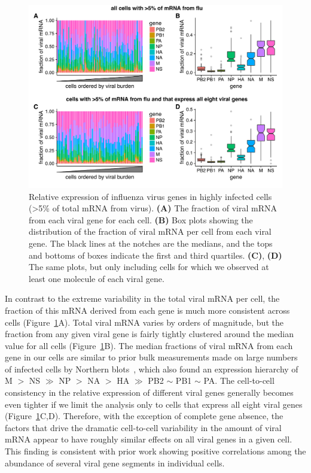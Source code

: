 \documentclass[9pt,lineno]{elife}
\begin{document}
\begin{figure}
\centerline{\includegraphics[width=0.9\linewidth]{figures/p_flu_expr_aledit.pdf}}
\caption{\label{fig:fluexpr}
Relative expression of influenza virus genes in highly infected cells (>5\% of total mRNA from virus).
{\bf (A)} 
The fraction of viral mRNA from each viral gene for each cell. 
{\bf (B)}
Box plots showing the distribution of the fraction of viral mRNA per cell from each viral gene.
The black lines at the notches are the medians, and the tops and bottoms of boxes indicate the first and third quartiles.
{\bf (C)}, {\bf (D)} 
The same plots, but only including cells for which we observed at least one molecule of each viral gene.
}
\end{figure}

In contrast to the extreme variability in the total viral mRNA per cell, the fraction of this mRNA derived from each gene is much more consistent across cells (Figure~\ref{fig:fluexpr}A).
Total viral mRNA varies by orders of magnitude, but the fraction from any given viral gene is fairly tightly clustered around the median value for all cells (Figure~\ref{fig:fluexpr}B).
The median fractions of viral mRNA from each gene in our cells are similar to prior bulk measurements made on large numbers of infected cells by Northern blots~\citep{hatada1989control}, which also found an expression hierarchy of M $>$ NS $\gg$ NP $>$ NA $>$ HA $\gg$ PB2 $\sim$ PB1 $\sim$ PA.
The cell-to-cell consistency in the relative expression of different viral genes generally becomes even tighter if we limit the analysis only to cells that express all eight viral genes (Figure~\ref{fig:fluexpr}C,D).
Therefore, with the exception of complete gene absence, the factors that drive the dramatic cell-to-cell variability in the amount of viral mRNA appear to have roughly similar effects on all viral genes in a given cell.
This finding is consistent with prior work showing positive correlations among the abundance of several viral gene segments in individual cells.
\end{document}
